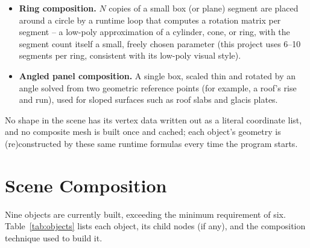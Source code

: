 \documentclass[11pt,a4paper]{article}
\begin{document}
\begin{itemize}[nosep]
  \item \textbf{Ring composition.} $N$ copies of a small box (or plane)
        segment are placed around a circle by a runtime loop that
        computes a rotation matrix per segment -- a low-poly
        approximation of a cylinder, cone, or ring, with the segment
        count itself a small, freely chosen parameter (this project uses
        6--10 segments per ring, consistent with its low-poly visual
        style).
  \item \textbf{Angled panel composition.} A single box, scaled thin and
        rotated by an angle solved from two geometric reference points
        (for example, a roof's rise and run), used for sloped surfaces
        such as roof slabs and glacis plates.
\end{itemize}

No shape in the scene has its vertex data written out as a literal
coordinate list, and no composite mesh is built once and cached; each
object's geometry is (re)constructed by these same runtime formulas
every time the program starts.

\section{Scene Composition}
\label{sec:scene}

Nine objects are currently built, exceeding the minimum requirement of
six. Table~\ref{tab:objects} lists each object, its child nodes (if
any), and the composition technique used to build it.
\end{document}
